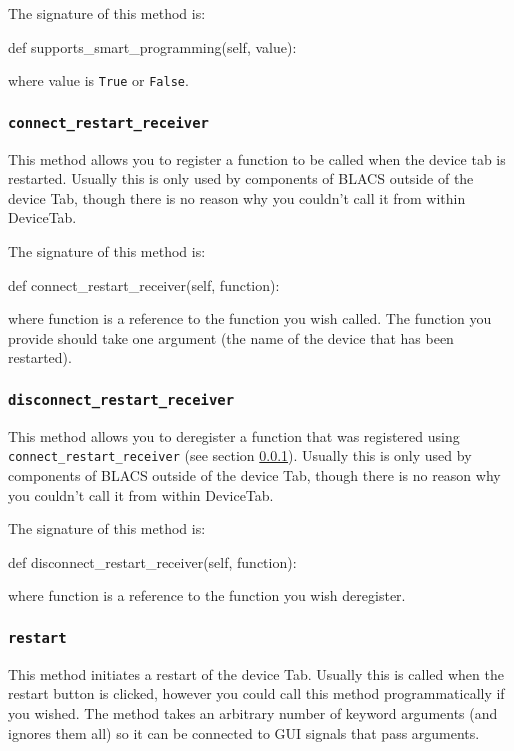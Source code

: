 \documentclass[12pt]{article}
\begin{document}

The signature of this method is:
\begin{python}
def supports_smart_programming(self, value):
\end{python}
where value is \texttt{True} or \texttt{False}.

%

\subsubsection{\texttt{connect\_restart\_receiver}}\label{ref:connect_restart_receiver}
This method allows you to register a function to be called when the device tab is restarted.
Usually this is only used by components of BLACS outside of the device Tab, though there is no reason why you couldn't call it from within DeviceTab.

The signature of this method is:
\begin{python}
def connect_restart_receiver(self, function):
\end{python}
where function is a reference to the function you wish called. 
The function you provide should take one argument (the name of the device that has been restarted).

\subsubsection{\texttt{disconnect\_restart\_receiver}}\label{ref:disconnect_restart_receiver}
This method allows you to deregister a function that was registered using \texttt{connect\_restart\_receiver} (see section \ref{ref:connect_restart_receiver}).
Usually this is only used by components of BLACS outside of the device Tab, though there is no reason why you couldn't call it from within DeviceTab.

The signature of this method is:
\begin{python}
def disconnect_restart_receiver(self, function):
\end{python}
where function is a reference to the function you wish deregister. 


\subsubsection{\texttt{restart}}\label{ref:restart}
This method initiates a restart of the device Tab. 
Usually this is called when the restart button is clicked, however you could call this method programmatically if you wished.
The method takes an arbitrary number of keyword arguments (and ignores them all) so it can be connected to GUI signals that pass arguments.
\end{document}
